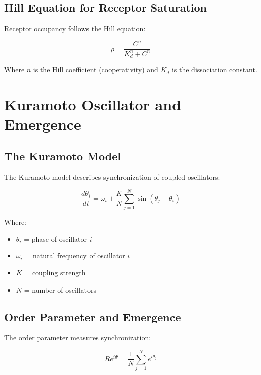 \documentclass[11pt,a4paper]{article}
\begin{document}
\subsection{Hill Equation for Receptor Saturation}

Receptor occupancy follows the Hill equation:

\begin{equation}
\rho = \frac{C^n}{K_d^n + C^n}
\end{equation}

Where $n$ is the Hill coefficient (cooperativity) and $K_d$ is the 
dissociation constant.


\section{Kuramoto Oscillator and Emergence}

\subsection{The Kuramoto Model}

The Kuramoto model describes synchronization of coupled oscillators:

\begin{equation}
\frac{d\theta_i}{dt} = \omega_i + \frac{K}{N}\sum_{j=1}^{N}\sin(\theta_j - \theta_i)
\end{equation}

Where:
\begin{itemize}
  \item $\theta_i$ = phase of oscillator $i$
  \item $\omega_i$ = natural frequency of oscillator $i$
  \item $K$ = coupling strength
  \item $N$ = number of oscillators
\end{itemize}

\subsection{Order Parameter and Emergence}

The order parameter measures synchronization:

\begin{equation}
R e^{i\Psi} = \frac{1}{N}\sum_{j=1}^{N}e^{i\theta_j}
\end{equation}
\end{document}
